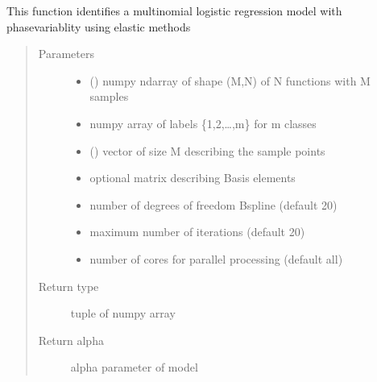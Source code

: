 \documentclass[letterpaper,10pt,english]{sphinxmanual}
\begin{document}
\begin{fulllineitems}
\label{\detokenize{regression:regression.elastic_mlogistic}}
This function identifies a multinomial logistic regression model with
phase\sphinxhyphen{}variablity using elastic methods
\begin{quote}\begin{description}
\item[{Parameters}] \leavevmode\begin{itemize}
\item {} 
 () \textendash{} numpy ndarray of shape (M,N) of N functions with M samples

\item {} 
 \textendash{} numpy array of labels \{1,2,…,m\} for m classes

\item {} 
 () \textendash{} vector of size M describing the sample points

\item {} 
 \textendash{} optional matrix describing Basis elements

\item {} 
 \textendash{} number of degrees of freedom B\sphinxhyphen{}spline (default 20)

\item {} 
 \textendash{} maximum number of iterations (default 20)

\item {} 
 \textendash{} number of cores for parallel processing (default all)

\end{itemize}

\item[{Return type}] \leavevmode
tuple of numpy array

\item[{Return alpha}] \leavevmode
alpha parameter of model


\end{description}
\end{quote}
\end{fulllineitems}
\end{document}
